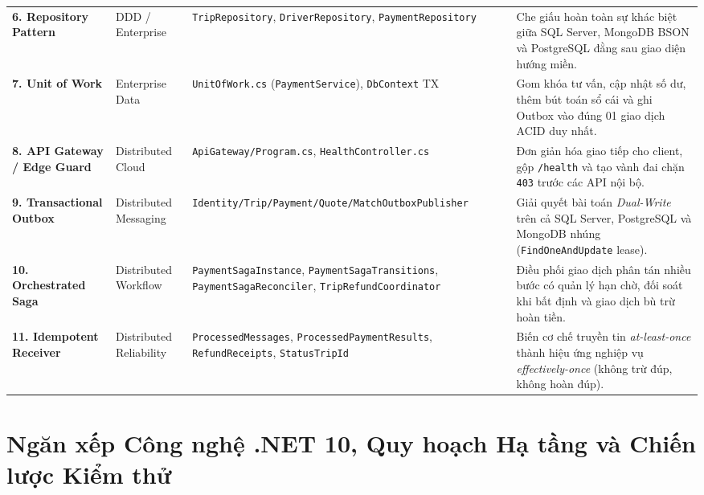 \documentclass[12pt,a4paper]{article}
\newcommand{\ab}{\allowbreak}
\begin{document}
{\begin{longtable}{L{3.0cm} L{2.1cm} L{4.2cm} L{5.5cm}}
\textbf{6. Repository Pattern} & DDD / Enterprise & \texttt{TripRepository}, \texttt{DriverRepository}, \texttt{PaymentRepository} & Che giấu hoàn toàn sự khác biệt giữa SQL Server, MongoDB BSON và PostgreSQL đằng sau giao diện hướng miền. \\
\addlinespace

\textbf{7. Unit of Work} & Enterprise Data & \texttt{UnitOfWork.cs} (\texttt{PaymentService}), \texttt{DbContext} TX & Gom khóa tư vấn, cập nhật số dư, thêm bút toán sổ cái và ghi Outbox vào đúng 01 giao dịch ACID duy nhất. \\
\addlinespace

\textbf{8. API Gateway / Edge Guard} & Distributed Cloud & \texttt{ApiGateway/Program.cs}, \texttt{HealthController.cs} & Đơn giản hóa giao tiếp cho client, gộp \texttt{/health} và tạo vành đai chặn \texttt{403} trước các API nội bộ. \\
\addlinespace

\textbf{9. Transactional Outbox} & Distributed Messaging & \texttt{Identity/\ab Trip/\ab Payment/\ab Quote/\ab Match\ab OutboxPublisher} & Giải quyết bài toán \textit{Dual-Write} trên cả SQL Server, PostgreSQL và MongoDB nhúng (\texttt{FindOneAndUpdate} lease). \\
\addlinespace

\textbf{10. Orchestrated Saga} & Distributed Workflow & \texttt{PaymentSagaInstance}, \texttt{PaymentSagaTransitions}, \texttt{PaymentSagaReconciler}, \texttt{TripRefundCoordinator} & Điều phối giao dịch phân tán nhiều bước có quản lý hạn chờ, đối soát khi bất định và giao dịch bù trừ hoàn tiền. \\
\addlinespace

\textbf{11. Idempotent Receiver} & Distributed Reliability & \texttt{ProcessedMessages}, \texttt{ProcessedPaymentResults}, \texttt{RefundReceipts}, \texttt{StatusTripId} & Biến cơ chế truyền tin \textit{at-least-once} thành hiệu ứng nghiệp vụ \textit{effectively-once} (không trừ đúp, không hoàn đúp). \\
\end{longtable}
\renewcommand{\arraystretch}{1.0}
}

\section{Ngăn xếp Công nghệ .NET 10, Quy hoạch Hạ tầng và Chiến lược Kiểm thử}
\end{document}
